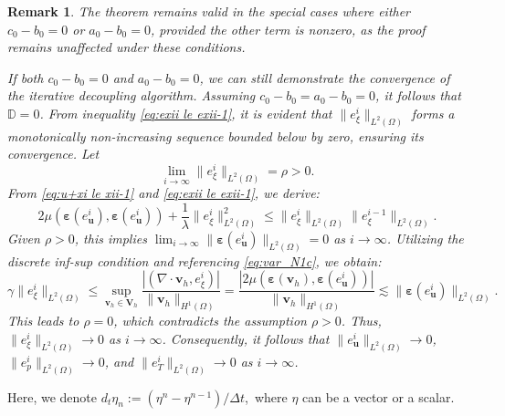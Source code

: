 \documentclass{article}
\newtheorem{remark}{Remark}
\numberwithin{equation}{section}
\begin{document}
\begin{remark} \label{re: a0-b0=c0-b0}
The theorem remains valid in the special cases where either \( c_0 - b_0 = 0 \) or \( a_0 - b_0 = 0 \), provided the other term is nonzero, as the proof remains unaffected under these conditions. 

If both \( c_0 - b_0 = 0 \) and \( a_0 - b_0 = 0 \), we can still demonstrate the convergence of the iterative decoupling algorithm. Assuming \( c_0 - b_0 = a_0 - b_0 = 0 \), it follows that \( \mathbb{D} = 0 \). From inequality \eqref{eq:exii le exii-1}, it is evident that \( \|e_{\xi}^i\|_{L^2(\Omega)} \) forms a monotonically non-increasing sequence bounded below by zero, ensuring its convergence. Let 
\[
\lim_{i \to \infty} \|e_{\xi}^i\|_{L^2(\Omega)} = \rho > 0.
\]
From \eqref{eq:u+xi le xii-1} and \eqref{eq:exii le exii-1}, we derive:
\[
2\mu(\bm{\varepsilon}(e_{\bm{u}}^i), \bm{\varepsilon}(e_{\bm{u}}^i)) 
+ \frac{1}{\lambda} \|e_{\xi}^i\|_{L^2(\Omega)}^2 
\leq \|e_{\xi}^i\|_{L^2(\Omega)} \|e_{\xi}^{i-1}\|_{L^2(\Omega)}.
\]
Given \( \rho > 0 \), this implies \( \lim_{i \to \infty} \|\bm{\varepsilon}(e_{\bm{u}}^i)\|_{L^2(\Omega)} = 0 \) as \( i \to \infty \).
Utilizing the discrete inf-sup condition and referencing \eqref{eq:var_N1c}, we obtain:
\[
\gamma \|e_{\xi}^i\|_{L^2(\Omega)} \leq \sup_{\bm{v}_h \in \bm{V}_h} 
\frac{|(\nabla \cdot \bm{v}_h, e_{\xi}^i)|}{\|\bm{v}_h\|_{H^1(\Omega)}}
= \frac{|2\mu(\bm{\varepsilon}(\bm{v}_h), \bm{\varepsilon}(e_{\bm{u}}^i))|}{\|\bm{v}_h\|_{H^1(\Omega)}}
\lesssim \|\bm{\varepsilon}(e_{\bm{u}}^i)\|_{L^2(\Omega)}.
\]
This leads to \( \rho = 0 \), which contradicts the assumption \( \rho > 0 \). Thus, \( \|e_{\xi}^i\|_{L^2(\Omega)} \to 0 \) as \( i \to \infty \).
Consequently, it follows that \( \|e_{\bm{u}}^i\|_{L^2(\Omega)} \to 0 \), \( \|e_p^i\|_{L^2(\Omega)} \to 0 \), and \( \|e_T^i\|_{L^2(\Omega)} \to 0 \) as \( i \to \infty \).
\end{remark}




Here, we denote $d_t \eta_n := ( \eta^n - \eta^{n-1}  )/\Delta t$,~where $\eta$ can be a vector or a scalar.
\end{document}
